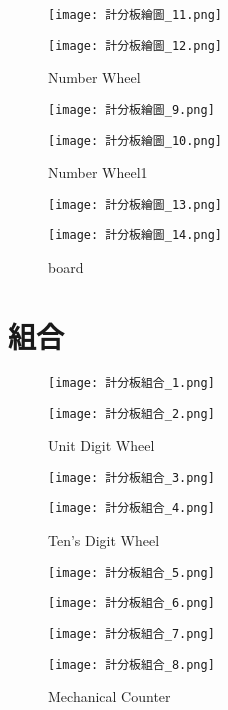 {\begin{figure}[hbt!]
  \centering
  \texttt{[image: 計分板繪圖\_11.png]}
\end{figure}
\begin{figure}[hbt!]
  \centering
  \texttt{[image: 計分板繪圖\_12.png]}
  \caption{Number Wheel}
  \label{fig:photo7}
\end{figure}

\begin{figure}[hbt!]
  \centering
  \texttt{[image: 計分板繪圖\_9.png]}
\end{figure}
\begin{figure}[hbt!]
  \centering
  \texttt{[image: 計分板繪圖\_10.png]}
  \caption{Number Wheel1}
  \label{fig:photo8}
\end{figure}

\begin{figure}[hbt!]
  \centering
  \texttt{[image: 計分板繪圖\_13.png]}
\end{figure}
\begin{figure}[hbt!]
  \centering
  \texttt{[image: 計分板繪圖\_14.png]}
  \caption{board}
  \label{fig:photo9}
\end{figure}
}

\section{組合}
{
\begin{figure}[hbt!]
  \centering
  \texttt{[image: 計分板組合\_1.png]}
\end{figure}
\begin{figure}[hbt!]
  \centering
  \texttt{[image: 計分板組合\_2.png]}
  \caption{Unit Digit Wheel}
  \label{fig:photo10}
\end{figure}

\begin{figure}[hbt!]
  \centering
  \texttt{[image: 計分板組合\_3.png]}
\end{figure}
\begin{figure}[hbt!]
  \centering
  \texttt{[image: 計分板組合\_4.png]}
  \caption{Ten's Digit Wheel}
  \label{fig:photo11}
\end{figure}

\begin{figure}[hbt!]
  \centering
  \texttt{[image: 計分板組合\_5.png]}
\end{figure}
\begin{figure}[hbt!]
  \centering
  \texttt{[image: 計分板組合\_6.png]}
\end{figure}
\begin{figure}[hbt!]
  \centering
  \texttt{[image: 計分板組合\_7.png]}
\end{figure}
\begin{figure}[hbt!]
  \centering
  \texttt{[image: 計分板組合\_8.png]}
  \caption{Mechanical Counter}
  \label{fig:photo12}
\end{figure}
}

